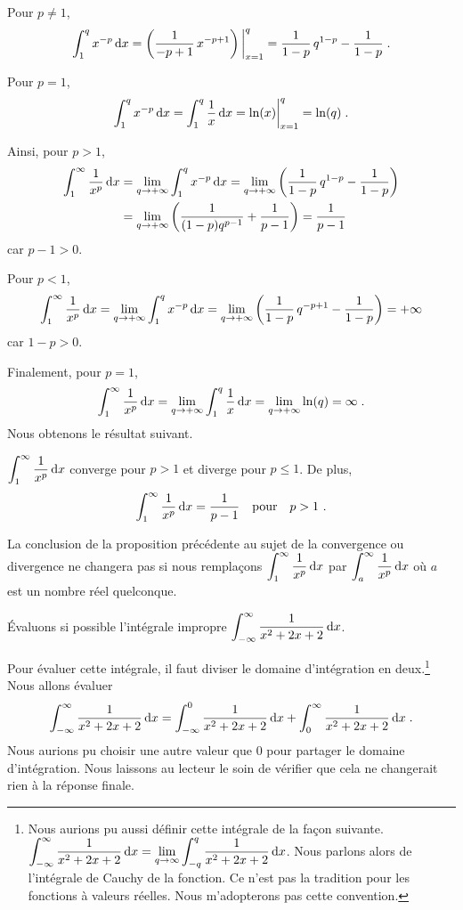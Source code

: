 {Pour $p\neq 1$,
\[
\int_1^q x^{-p} \,\mathrm{d}x
= \left( \frac{1}{-p+1} \, x^{-p+1} \right)\bigg|_{x=1}^q
= \frac{1}{1-p} \, q^{1-p} - \frac{1}{1-p} \; .
\]

Pour $p=1$,
\[
\int_1^q x^{-p} \,\mathrm{d}x = \int_1^q \frac{1}{x} \,\mathrm{d}x
= \ln(x)\bigg|_{x=1}^q = \ln(q) \; .
\]

Ainsi, pour $p>1$,
\begin{align*}
\int_1^\infty \frac{1}{x^p} \,\mathrm{d}x
&= \lim_{q\rightarrow +\infty} \int_1^q x^{-p} \,\mathrm{d}x
= \lim_{q\rightarrow +\infty}
\left( \frac{1}{1-p} \, q^{1-p} - \frac{1}{1-p} \right) \\
&= \lim_{q\rightarrow +\infty}
\left( \frac{1}{(1-p)q^{p-1}} + \frac{1}{p-1} \right)
= \frac{1}{p-1}
\end{align*}
car $p-1>0$.

Pour $p<1$,
\[
\int_1^\infty \frac{1}{x^p} \,\mathrm{d}x
= \lim_{q\rightarrow +\infty} \int_1^q x^{-p} \,\mathrm{d}x
= \lim_{q\rightarrow +\infty}
\left( \frac{1}{1-p} \, q^{-p+1} - \frac{1}{1-p} \right)
= +\infty
\]
car $1-p>0$.

Finalement, pour $p=1$,
\[
\int_1^\infty \frac{1}{x^p} \,\mathrm{d}x
= \lim_{q\rightarrow +\infty} \int_1^q \frac{1}{x} \,\mathrm{d}x
= \lim_{q\rightarrow +\infty} \ln(q) = \infty \; .
\]
Nous obtenons le résultat suivant.

\begin{focus}{\prp} \label{impr_comp1}
$\displaystyle \int_1^\infty \frac{1}{x^p} \,\mathrm{d}x$ converge pour $p>1$
et diverge pour $p\leq 1$.  De plus,
\[
\int_1^\infty \frac{1}{x^p} \,\mathrm{d}x = \frac{1}{p-1} \quad \text{pour}
\quad p>1 \ .
\]
\end{focus}

La conclusion de la proposition précédente au sujet de la convergence
ou divergence ne changera pas si nous remplaçons
$\displaystyle \int_1^\infty \frac{1}{x^p} \,\mathrm{d}x$
par $\displaystyle \int_a^\infty \frac{1}{x^p} \,\mathrm{d}x$
où $a$ est un nombre réel quelconque.

\begin{egg}
Évaluons si possible l'intégrale impropre
$\displaystyle \int_{-\infty}^\infty \frac{1}{x^2+2x+2} \,\mathrm{d}x$.

Pour évaluer cette intégrale, il faut diviser le domaine d'intégration
en deux.\footnote{Nous aurions pu aussi définir cette intégrale de la
façon suivante.
$\displaystyle \int_{-\infty}^\infty \frac{1}{x^2+2x+2} \,\mathrm{d}x
= \lim_{q\to \infty} \int_{-q}^q \frac{1}{x^2+2x+2} \,\mathrm{d}x$.  Nous parlons
alors de l'intégrale de Cauchy de la fonction.  Ce n'est pas la
tradition pour les fonctions à valeurs réelles.  Nous m'adopterons pas
cette convention.}  Nous allons évaluer
\[
\int_{-\infty}^\infty \frac{1}{x^2+2x+2} \,\mathrm{d}x
= \int_{-\infty}^0 \frac{1}{x^2+2x+2} \,\mathrm{d}x
+ \int_0^\infty \frac{1}{x^2+2x+2} \,\mathrm{d}x \; .
\]
Nous aurions pu choisir une autre valeur que $0$ pour partager le domaine
d'intégration.  Nous laissons au lecteur le soin de vérifier que cela ne
changerait rien à la réponse finale.


\end{egg}}
